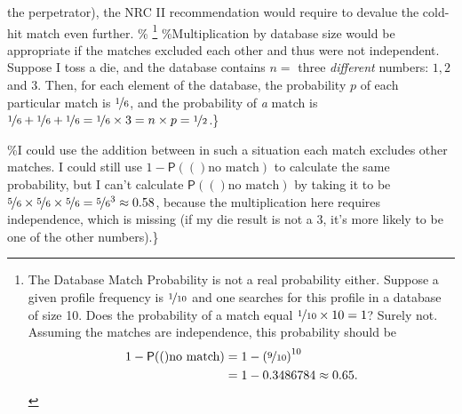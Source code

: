\documentclass[10pt,dvipsnames,enabledeprecatedfontcommands]{scrartcl}
\newcommand{\pr}[1]{\mathsf{P}(#1)}
\begin{document}
the perpetrator), the NRC II recommendation would require to devalue the
cold-hit match even further. \%
\footnote{The Database Match Probability is not a real probability either. Suppose a given profile frequency is $
\nicefrac{1}{10}$ and one searches for this profile in a database of size 10. Does the  probability of a match  equal $\nicefrac{1}{10}\times 10=1$? Surely not. Assuming the matches are independence, %
this probability should be
\begin{align*}
1-\pr(\textrm{no match}) & = 1- \left(\nicefrac{9}{10}\right)^{10}\\
& = 1- 0.3486784 \approx 0.65.
\end{align*}} \%Multiplication by database size would be appropriate if
the matches excluded each other and thus were not independent. Suppose I
toss a die, and the database contains \(n=\) three \emph{different}
numbers: \(1, 2\) and \(3\). Then, for each element of the database, the
probability \(p\) of each particular match is \(\nicefrac{1}{6}\), and
the probability of \emph{a} match is
\(\nicefrac{1}{6}+\nicefrac{1}{6}+\nicefrac{1}{6}=\nicefrac{1}{6}\times 3 = n\times p =\nicefrac{1}{2}\).\}

\%I could use the addition between in such a situation each match
excludes other matches. I could still use \(1-\pr(\textrm{no match})\)
to calculate the same probability, but I can't calculate
\(\pr(\textrm{no match})\) by taking it to be
\(\nicefrac{5}{6}\times \nicefrac{5}{6}\times \nicefrac{5}{6} = \nicefrac{5}{6}^3 \approx 0.58\),
because the multiplication here requires independence, which is missing
(if my die result is not a 3, it's more likely to be one of the other
numbers).\}
\end{document}
